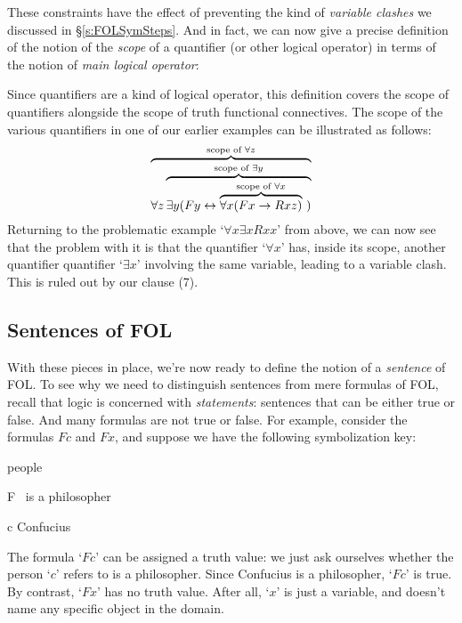 These constraints have the effect of preventing the kind of \emph{variable clashes} we discussed in \S\ref{s:FOLSymSteps}. And in fact, we can now give a precise definition of the notion of the \emph{scope} of a quantifier (or other logical operator) in terms of the notion of \emph{main logical operator}:



Since quantifiers are a kind of logical operator, this definition covers the scope of quantifiers alongside the scope of truth functional connectives.  The scope of the various quantifiers in one of our earlier examples can be illustrated as follows:
$$\overbrace{\forall z\overbrace{\exists y (Fy \leftrightarrow \overbrace{\forall x (Fx \rightarrow Rxz)}^{\text{scope of $\forall x$}}
\ )}^{\text{scope of $\exists y$}}}^{\text{scope of $\forall z$}}$$
Returning to the problematic example `$\forall x\exists xRxx$' from above, we can now see that the problem with it is that the quantifier `$\forall x$' has, inside its scope, another quantifier quantifier `$\exists x$' involving the same variable, leading to a variable clash.  This is ruled out by our clause (7).

\subsection{Sentences of FOL}
With these pieces in place, we're now ready to define the notion of a \emph{sentence} of FOL.  To see why we need to distinguish sentences from mere formulas of FOL, recall that logic is concerned with \emph{statements}: sentences  that can be either true or false. And many formulas are not true or false.  For example, consider the formulas $Fc$ and $Fx$, and suppose we have the following symbolization key:
	\begin{ekey}
		\item[\text{domain}] people
		\item[F] \blank \ is a philosopher
		\item[c] Confucius
	\end{ekey}
The formula `$Fc$' can be assigned a truth value: we just ask ourselves whether the person `$c$' refers to is a philosopher.  Since Confucius is a philosopher, `$Fc$' is true.  By contrast, `$Fx$' has no truth value.  After all, `$x$' is just a variable, and doesn't name any specific object in the domain.

